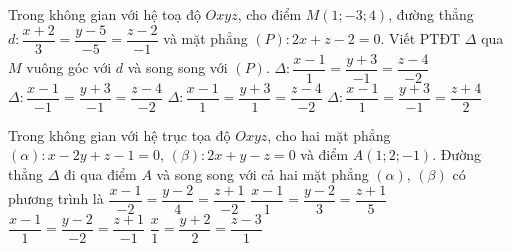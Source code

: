\begin{ex}%
	Trong không gian với hệ toạ độ $Oxyz$, cho điểm $M(1;-3;4)$, đường thẳng $d\colon \dfrac{x+2}{3}=\dfrac{y-5}{-5}=\dfrac{z-2}{-1}$ và mặt phẳng $(P)\colon 2x+z-2=0$. Viết PTĐT $\Delta$ qua $M$ vuông góc với $d$ và song song với $(P)$.
	\choice
	{$\Delta\colon\dfrac{x-1}{1}=\dfrac{y+3}{-1}=\dfrac{z-4}{-2}$}
	{$\Delta\colon\dfrac{x-1}{-1}=\dfrac{y+3}{-1}=\dfrac{z-4}{-2}$}
	{\True $\Delta\colon\dfrac{x-1}{1}=\dfrac{y+3}{1}=\dfrac{z-4}{-2}$}
	{$\Delta\colon\dfrac{x-1}{1}=\dfrac{y+3}{-1}=\dfrac{z+4}{2}$}
\end{ex}
\begin{ex}%
	Trong không gian với hệ trục tọa độ $Oxyz$, cho hai mặt phẳng $(\alpha) \colon x-2y+z-1=0$, $(\beta) \colon 2x+y-z=0$ và điểm $A(1;2;-1)$. Đường thẳng $\Delta $ đi qua điểm $A$ và song song với cả hai mặt phẳng $(\alpha)$, $(\beta)$ có phương trình là
	\choice
	{$\dfrac{x-1}{-2}=\dfrac{y-2}{4}=\dfrac{z+1}{-2}$}
	{\True $\dfrac{x-1}{1}=\dfrac{y-2}{3}=\dfrac{z+1}{5}$}
	{$\dfrac{x-1}{1}=\dfrac{y-2}{-2}=\dfrac{z+1}{-1}$}
	{$\dfrac{x}{1}=\dfrac{y+2}{2}=\dfrac{z-3}{1}$}
\end{ex}
